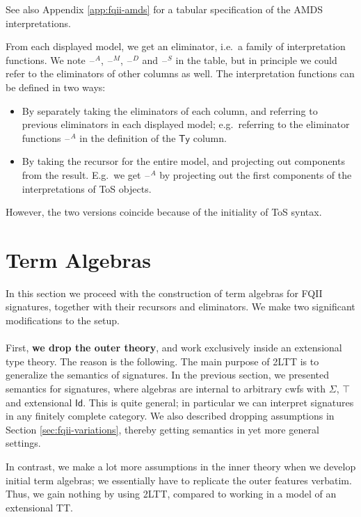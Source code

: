 \documentclass[12pt,a4paper,twoside,openany]{book}
\theoremstyle{remark}
\theoremstyle{definition}
\theoremstyle{theorem}
\newcommand{\Ty}{\mathsf{Ty}}
\newcommand{\Id}{\mathsf{Id}}
\newcommand{\blank}{\mathord{\hspace{1pt}\text{--}\hspace{1pt}}}
\begin{document}
See also Appendix \ref{app:fqii-amds} for a tabular specification of the AMDS
interpretations.

From each displayed model, we get an eliminator, i.e.\ a family of
interpretation functions. We note $\blank^A$, $\blank^M$, $\blank^D$ and
$\blank^S$ in the table, but in principle we could refer to the eliminators of
other columns as well. The interpretation functions can be defined in two ways:
\begin{itemize}
\item By separately taking the eliminators of each column, and referring to previous
      eliminators in each displayed model; e.g.\ referring to the eliminator functions $\blank^A$ in
      the definition of the $\Ty$ column.
\item By taking the recursor for the entire model, and projecting out components from the result. E.g.\
      we get $\blank^A$ by projecting out the first components of the interpretations of ToS objects.
\end{itemize}
However, the two versions coincide because of the initiality of ToS syntax.


\section{Term Algebras}
\label{sec:fqiit-term-algebras}

In this section we proceed with the construction of term algebras for FQII
signatures, together with their recursors and eliminators. We make two
significant modifications to the setup.
\\\\
\indent First, \textbf{we drop the outer theory}, and work exclusively inside an
extensional type theory. The reason is the following. The main purpose of 2LTT
is to generalize the semantics of signatures. In the previous section, we
presented semantics for signatures, where algebras are internal to arbitrary
cwfs with $\Sigma$, $\top$ and extensional $\Id$. This is quite general; in
particular we can interpret signatures in any finitely complete category. We
also described dropping assumptions in Section \ref{sec:fqii-variations},
thereby getting semantics in yet more general settings.

In contrast, we make a lot more assumptions in the inner theory when we develop
initial term algebras; we essentially have to replicate the outer features
verbatim.  Thus, we gain nothing by using 2LTT, compared to working in a model
of an extensional TT.
\end{document}
